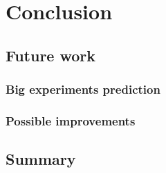 
\chapter{Conclusion}\label{chapter:conclusion}

\section{Future work}
\subsection{Big experiments prediction}

\subsection{Possible improvements}

\section{Summary}


